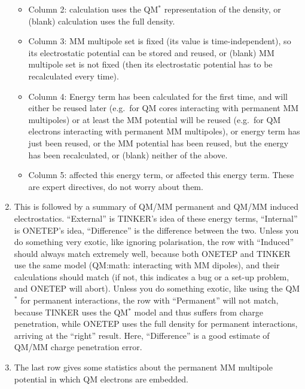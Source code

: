 \documentclass[letterpaper,10pt,english]{sphinxmanual}
\begin{document}
\begin{enumerate}
\begin{itemize}
\item {} 
Column 2: \sphinxcode{*} \textendash{} calculation uses the QM\(^*\)
representation of the density, or (blank) \textendash{} calculation uses the
full density.

\item {} 
Column 3:  \textendash{} MM multipole set is fixed (its value is
time-independent), so its electrostatic potential can be stored
and reused, or (blank) \textendash{} MM multipole set is not fixed (then its
electrostatic potential has to be recalculated every time).

\item {} 
Column 4:  \textendash{} Energy term has been calculated for the first
time, and will either be reused later (e.g. for QM cores
interacting with permanent MM multipoles) or at least the MM
potential will be reused (e.g. for QM electrons interacting with
permanent MM multipoles), or  \textendash{} energy term has just been
reused, or  \textendash{} the MM potential has been reused, but the
energy has been recalculated, or (blank) \textendash{} neither of the above.

\item {} 
Column 5:  \textendash{}  affected this energy
term, or  \textendash{}  affected this energy
term. These are expert directives, do not worry about them.

\end{itemize}

\item {} 
This is followed by a summary of QM/MM permanent and QM/MM induced
electrostatics. “External” is TINKER’s idea of these energy terms,
“Internal” is ONETEP’s idea, “Difference” is the difference between
the two. Unless you do something very exotic, like ignoring
polarisation, the row with “Induced” should always match extremely
well, because both ONETEP and TINKER use the same model (QM:math:\sphinxtitleref{\textasciicircum{}*}
interacting with MM dipoles), and their calculations should match (if
not, this indicates a bug or a set-up problem, and ONETEP will
abort). Unless you do something exotic, like using the QM\(^*\)
for permanent interactions, the row with “Permanent” will not match,
because TINKER uses the QM\(^{*}\) model and thus suffers from
charge penetration, while ONETEP uses the full density for permanent
interactions, arriving at the “right” result. Here, “Difference” is a
good estimate of QM/MM charge penetration error.

\item {} 
The last row gives some statistics about the permanent MM multipole
potential in which QM electrons are embedded.

\end{enumerate}
\end{document}
